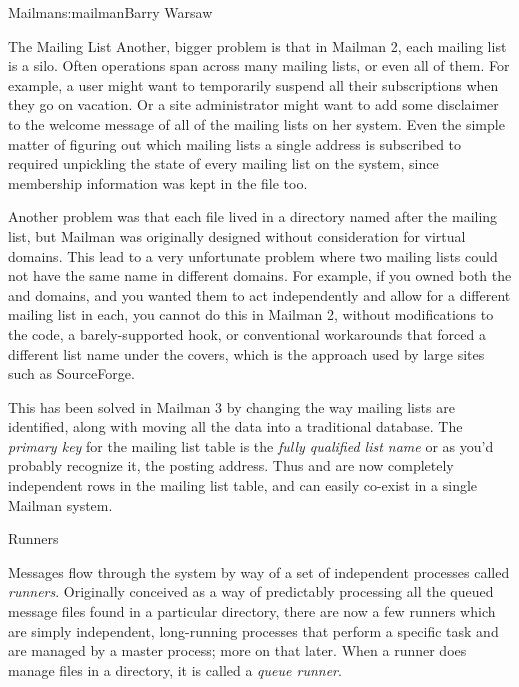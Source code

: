 \begin{aosachapter}{Mailman}{s:mailman}{Barry Warsaw}
\begin{aosasect1}{The Mailing List}
Another, bigger problem is that in Mailman 2, each mailing list is a
silo.  Often operations span across many mailing lists, or even all of
them.  For example, a user might want to temporarily suspend all their
subscriptions when they go on vacation.  Or a site administrator might
want to add some disclaimer to the welcome message of all of the
mailing lists on her system.  Even the simple matter of figuring out
which mailing lists a single address is subscribed to required
unpickling the state of every mailing list on the system, since
membership information was kept in the  file too.

Another problem was that each  file lived in a
directory named after the mailing list, but Mailman was originally
designed without consideration for virtual domains.  This lead to a
very unfortunate problem where two mailing lists could not have the
same name in different domains.  For example, if you owned both the
 and  domains, and you wanted them
to act independently and allow for a different  mailing
list in each, you cannot do this in Mailman 2, without modifications
to the code, a barely-supported hook, or conventional workarounds that
forced a different list name under the covers, which is the approach
used by large sites such as SourceForge.

This has been solved in Mailman 3 by changing the way mailing lists
are identified, along with moving all the data into a traditional
database.  The \emph{primary key} for the mailing list table is the
\emph{fully qualified list name} or as you'd probably recognize it,
the posting address.  Thus  and
 are now completely independent rows in the
mailing list table, and can easily co-exist in a single Mailman
system.

\end{aosasect1}

\begin{aosasect1}{Runners}

Messages flow through the system by way of a set of independent
processes called \emph{runners}.  Originally conceived as a way of
predictably processing all the queued message files found in a
particular directory, there are now a few runners which are simply
independent, long-running processes that perform a specific task and
are managed by a master process; more on that later.  When a runner
does manage files in a directory, it is called a \emph{queue runner}.


\end{aosasect1}
\end{aosachapter}
